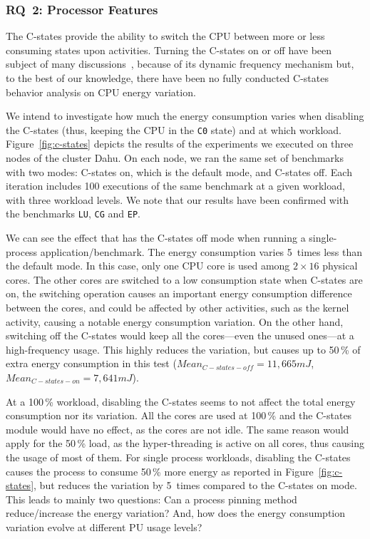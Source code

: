 \subsubsection{\textsc{RQ}~2: Processor Features}
The C-states provide the ability to switch the CPU between more or less consuming states upon activities.
Turning the C-states on or off have been subject of many discussions~\cite{5463056}, because of its dynamic frequency mechanism but, to the best of our knowledge, there have been no fully conducted C-states behavior analysis on CPU energy variation.

We intend to investigate how much the energy consumption varies when disabling the C-states (thus, keeping the CPU in the \texttt{C0} state) and at which workload.
Figure~\ref{fig:c-states} depicts the results of the experiments we executed on three nodes of the cluster \textsf{Dahu}.
On each node, we ran the same set of benchmarks with two modes: \textsf{C-states on}, which is the default mode, and \textsf{C-states off}.
Each iteration includes 100 executions of the same benchmark at a given workload, with three workload levels.
We note that our results have been confirmed with the benchmarks \texttt{LU}, \texttt{CG} and \texttt{EP}.

We can see the effect that has the \textsf{C-states off} mode when running a single-process application/benchmark.
The energy consumption varies 5~times less than the default mode.
In this case, only one CPU core is used among $2\times16$ physical cores.
The other cores are switched to a low consumption state when C-states are on, the switching operation causes an important energy consumption difference between the cores, and could be affected by other activities, such as the kernel activity, causing a notable energy consumption variation.
On the other hand, switching off the C-states would keep all the cores---even the unused ones---at a high-frequency usage.
This highly reduces the variation, but causes up to 50\,\% of extra energy consumption in this test ($Mean_{C-states-off}=11,665 mJ$,$Mean_{C-states-on}=7,641 mJ$).

At a 100\,\% workload, disabling the C-states seems to not affect the total energy consumption nor its variation.
All the cores are used at 100\,\% and the C-states module would have no effect, as the cores are not idle.
The same reason would apply for the 50\,\% load, as the hyper-threading is active on all cores, thus causing the usage of most of them.
For single process workloads, disabling the C-states causes the process to consume 50\,\% more energy as reported in Figure~\ref{fig:c-states}, but reduces the variation by 5~times compared to the \textsf{C-states on} mode.
This leads to mainly two questions: Can a process pinning method reduce/increase the energy variation? And, how does the energy consumption variation evolve at different PU usage levels?

